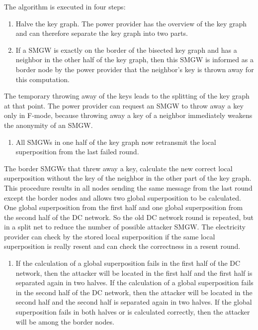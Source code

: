 The algorithm is executed in four steps:
\begin{enumerate}
\item Halve the key graph. 
The power provider has the overview of the key graph and can therefore separate the key graph into two parts. %
\item If a \gls{SMGW} is exactly on the border of the bisected key graph and has a neighbor in the other half of the key graph, then this \gls{SMGW} is informed as a border node by the power provider that the neighbor's key is thrown away for this computation.
\end{enumerate}
The temporary throwing away of the keys leads to the splitting of the key graph at that point. The power provider can request an \gls{SMGW} to throw away a key only in F-mode, because throwing away a key of a neighbor immediately weakens the anonymity of an \gls{SMGW}. 
\begin{enumerate}[resume] 
\item All SMGWs in one half of the key graph now retransmit the local superposition from the last failed round. 
\end{enumerate}
The border \gls{SMGW}s that threw away a key, calculate the new correct local superposition without the key of the neighbor in the other part of the key graph. This procedure results in all nodes sending the same message from the last round except the border nodes and allows two global superposition to be calculated. One global superposition from the first half and one global superposition from the second half of the DC network. So the old DC network round is repeated, but in a split net to reduce the number of possible attacker \gls{SMGW}. The electricity provider can check by the stored local superposition if the same local superposition is really resent and can check the correctness in a resent round. 
\begin{enumerate}[resume]
\item If the calculation of a global superposition fails in the first half of the DC network, then the attacker will be located in the first half and the first half is separated again in two halves. If the calculation of a global superposition fails in the second half of the DC network, then the attacker will be located in the second half and the second half is separated again in two halves. If the global superposition fails in both halves or is calculated correctly, then the attacker will be among the border nodes.
\end{enumerate}
